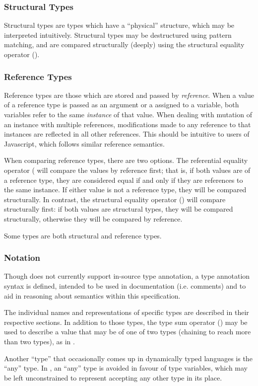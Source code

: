 \subsubsection{Structural Types}

Structural types are types which have a ``physical'' structure, which may be
interpreted intuitively. Structural types may be destructured using pattern
matching, and are compared structurally (deeply) using the structural equality
operator (\op{==}).

\subsubsection{Reference Types}

Reference types are those which are stored and passed by \emph{reference}. When
a value of a reference type is passed as an argument or a assigned to a variable, both
variables refer to the same \emph{instance} of that value. When dealing with
mutation of an instance with multiple references, modifications made to any
reference to that instances are reflected in all other references. This should be
intuitive to users of Javascript, which follows similar reference semantics.

When comparing reference types, there are two options. The referential equality
operator (\op{===)} will compare the values by reference first; that is, if
both values are of a reference type, they are considered equal if and only
if they are references to the same instance. If either value is not a reference
type, they will be compared structurally. In contrast, the structural equality
operator (\kw{==}) will compare structurally first: if both values are structural
types, they will be compared structurally, otherwise they will be compared by
reference.

Some types are both structural and reference types.

\subsubsection{Notation}

Though \Trilogy{} does not currently support in-source type annotation, a
type annotation syntax is defined, intended to be used in documentation
(i.e. comments) and to aid in reasoning about semantics within this specification.

The individual names and representations of specific types are described
in their respective sections. In addition to those types, the type sum operator
(\op{|}) may be used to describe a value that may be of one of two types (chaining
to reach more than two types), as in .

Another ``type'' that occasionally comes up in dynamically typed languages is the
``any'' type. In \Trilogy{}, an ``any'' type is avoided in favour of type variables,
which may be left unconstrained to represent accepting any other type in its place.






